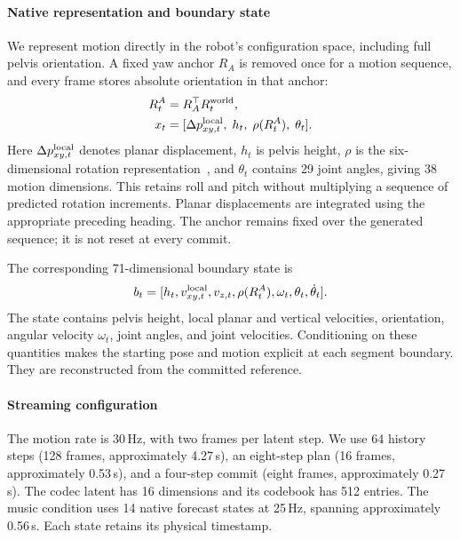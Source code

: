 \paragraph{Native representation and boundary state}

We represent motion directly in the robot's configuration space, including full pelvis orientation. A fixed yaw anchor $R_A$ is removed once for a motion sequence, and every frame stores absolute orientation in that anchor:
\begin{align}
 R_t^A&=R_A^\top R_t^{\rm world},\\
 x_t&=[\Delta p_{xy,t}^{\rm local},\;h_t,\;\rho(R_t^A),\;\theta_t].
\label{eq:motion}
\end{align}
Here $\Delta p_{xy,t}^{\rm local}$ denotes planar displacement, $h_t$ is pelvis height, $\rho$ is the six-dimensional rotation representation~\cite{zhou2019rotation}, and $\theta_t$ contains 29 joint angles, giving 38 motion dimensions. This retains roll and pitch without multiplying a sequence of predicted rotation increments. Planar displacements are integrated using the appropriate preceding heading. The anchor remains fixed over the generated sequence; it is not reset at every commit.

The corresponding 71-dimensional boundary state is
\begin{equation}
 b_t=[h_t,v^{\rm local}_{xy,t},v_{z,t},\rho(R_t^A),\omega_t,
 \theta_t,\dot\theta_t].
\label{eq:state}
\end{equation}
The state contains pelvis height, local planar and vertical velocities, orientation, angular velocity $\omega_t$, joint angles, and joint velocities. Conditioning on these quantities makes the starting pose and motion explicit at each segment boundary. They are reconstructed from the committed reference.


\paragraph{Streaming configuration}
The motion rate is 30\,Hz, with two frames per latent step. We use 64 history
steps (128 frames, approximately 4.27\,s), an eight-step plan (16 frames,
approximately 0.53\,s), and a four-step commit (eight frames, approximately
0.27\,s). The codec latent has 16 dimensions and its codebook has 512 entries.
The music condition uses 14 native forecast states at 25\,Hz, spanning
approximately 0.56\,s. Each state retains its physical timestamp.

